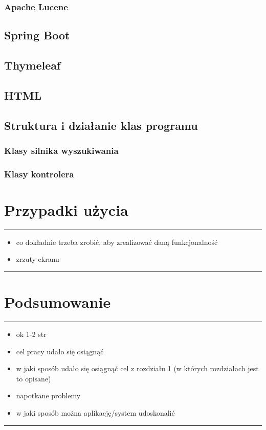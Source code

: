 \documentclass[licencjacka]{pracadypl}
\theoremstyle{definition}
\newcommand{\linia}{\rule{\linewidth}{0.4mm}}
\begin{document}
\subsection{Apache Lucene}
\section{Spring Boot}
\section{Thymeleaf}
\section{HTML}
\section{Struktura i działanie klas programu}
\subsection{Klasy silnika wyszukiwania}
\subsection{Klasy kontrolera}


\chapter{Przypadki użycia}
\linia
\begin{itemize}
	\item co dokładnie trzeba zrobić, aby zrealizować daną funkcjonalność
	\item zrzuty ekranu
\end{itemize}
\linia

\chapter{Podsumowanie}
\linia
\begin{itemize}
	\item ok 1-2 str
	\item cel pracy udało się osiągnąć
	\item w jaki sposób udało się osiągnąć cel z rozdziału 1 (w których rozdziałach jest to opisane)
	\item napotkane problemy
	\item w jaki sposób można aplikację/system udoskonalić
\end{itemize}

\linia
\cite{google-power-searching}

 

	
	
\end{document}
